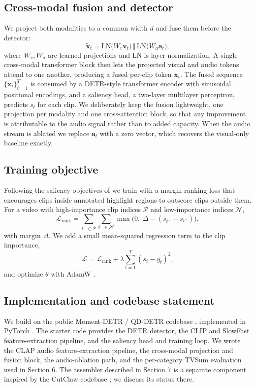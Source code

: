 \documentclass[10pt,twocolumn,letterpaper]{article}
\begin{document}
\subsection{Cross-modal fusion and detector}
We project both modalities to a common width $d$ and fuse them before the detector:
\begin{equation}
  \tilde{\mathbf{x}}_t = \mathrm{LN}\!\big(W_v \mathbf{v}_t\big) \,\Vert\, \mathrm{LN}\!\big(W_a \mathbf{a}_t\big),
\end{equation}
where $W_v, W_a$ are learned projections and $\mathrm{LN}$ is layer normalization. A single cross-modal transformer block then lets the projected visual and audio tokens attend to one another, producing a fused per-clip token $\mathbf{x}_t$. The fused sequence $\{\mathbf{x}_t\}_{t=1}^T$ is consumed by a DETR-style \cite{detr,momentdetr} transformer encoder with sinusoidal positional encodings, and a saliency head, a two-layer multilayer perceptron, predicts $s_t$ for each clip. We deliberately keep the fusion lightweight, one projection per modality and one cross-attention block, so that any improvement is attributable to the audio signal rather than to added capacity. When the audio stream is ablated we replace $\mathbf{a}_t$ with a zero vector, which recovers the visual-only baseline exactly.

\subsection{Training objective}
Following the saliency objectives of \cite{momentdetr,qddetr} we train with a margin-ranking loss that encourages clips inside annotated highlight regions to outscore clips outside them. For a video with high-importance clip indices $\mathcal{P}$ and low-importance indices $\mathcal{N}$,
\begin{equation}
  \mathcal{L}_{\mathrm{rank}} = \sum_{t^+ \in \mathcal{P}} \sum_{t^- \in \mathcal{N}} \max\!\big(0,\; \Delta - (s_{t^+} - s_{t^-})\big),
\end{equation}
with margin $\Delta$. We add a small mean-squared regression term to the clip importance,
\begin{equation}
  \mathcal{L} = \mathcal{L}_{\mathrm{rank}} + \lambda \sum_{t=1}^{T} (s_t - y_t)^2,
\end{equation}
and optimize $\theta$ with AdamW \cite{adamw}.

\subsection{Implementation and codebase statement}
We build on the public Moment-DETR / QD-DETR codebase \cite{momentdetr,qddetr}, implemented in PyTorch \cite{pytorch}. The starter code provides the DETR detector, the CLIP and SlowFast feature-extraction pipeline, and the saliency head and training loop. We wrote the CLAP audio feature-extraction pipeline, the cross-modal projection and fusion block, the audio-ablation path, and the per-category TVSum evaluation used in Section 6. The assembler described in Section 7 is a separate component inspired by the CutClaw codebase \cite{cutclaw}; we discuss its status there.
\end{document}
